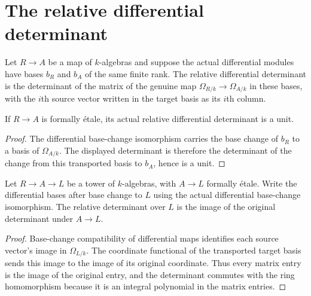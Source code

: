 \section{The relative differential determinant}

\begin{definition}\label{def:sc0-relative-differential-determinant}
\leanok
Let $R\to A$ be a map of $k$-algebras and suppose the actual differential modules
have bases $b_R$ and $b_A$ of the same finite rank. The relative differential
determinant is the determinant of the matrix of the genuine map
$\Omega_{R/k}\to\Omega_{A/k}$ in these bases, with the $i$th source vector written
in the target basis as its $i$th column.
\end{definition}

\begin{lemma}\label{lem:sc0-relative-differential-det-unit}
\leanok
{}
If $R\to A$ is formally \'etale, its actual relative differential determinant is
a unit.
\end{lemma}
\begin{proof}
The differential base-change isomorphism carries the base change of $b_R$ to a
basis of $\Omega_{A/k}$. The displayed determinant is therefore the determinant
of the change from this transported basis to $b_A$, hence is a unit.
\end{proof}

\begin{lemma}\label{lem:sc0-relative-differential-det-basechange}
\leanok
{}
Let $R\to A\to L$ be a tower of $k$-algebras, with $A\to L$ formally \'etale.
Write the differential bases after base change to $L$ using the actual
differential base-change isomorphism. The relative determinant over $L$ is the
image of the original determinant under $A\to L$.
\end{lemma}
\begin{proof}
Base-change compatibility of differential maps identifies each source vector's
image in $\Omega_{L/k}$. The coordinate functional of the transported target basis
sends this image to the image of its original coordinate. Thus every matrix
entry is the image of the original entry, and the determinant commutes with the
ring homomorphism because it is an integral polynomial in the matrix entries.
\end{proof}

